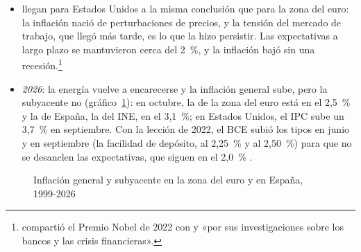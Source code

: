 \documentclass[11pt]{article}
\begin{document}
\begin{itemize}
\item \textcite{BernankeBlanchard2025What} llegan para Estados Unidos a la misma conclusión que \textcite{ArceEtAl2024What} para la zona del euro: la inflación nació de perturbaciones de precios, y la tensión del mercado de trabajo, que llegó más tarde, es lo que la hizo persistir. Las expectativas a largo plazo se mantuvieron cerca del 2~\%, y la inflación bajó sin una recesión.\footnote{ compartió el Premio Nobel de 2022 con  y  «por sus investigaciones sobre los bancos y las crisis financieras»\nocite{Nobel2022}.}
\item \emph{2026}: la energía vuelve a encarecerse y la inflación general sube, pero la subyacente no (gráfico~\ref{fig:inflacion-general-subyacente}): en octubre, la de la zona del euro está en el 2,5~\%\nocite{Eurostat2026IAPCoct} y la de España, la del INE, en el 3,1~\%\nocite{INE2026IPCAdelantadoOct}; en Estados Unidos, el IPC sube un 3,7~\% en septiembre\nocite{BLS2026IPC}. Con la lección de 2022, el BCE subió los tipos en junio y en septiembre (la facilidad de depósito, al 2,25~\% y al 2,50~\%) para que no se desanclen las expectativas\nocite{BCE2026Tipos}, que siguen en el 2,0~\%\nocite{BCE2026SPF4T} .
\end{itemize}

\begin{figure}[H]
\centering
\caption{Inflación general y subyacente en la zona del euro y en España, 1999-2026}\label{fig:inflacion-general-subyacente}
\end{figure}
\end{document}
